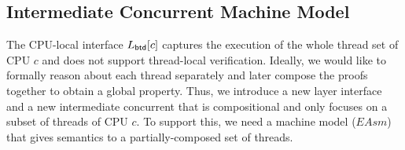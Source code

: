 \subsection{Intermediate Concurrent Machine Model}\label{subsec:fulleasm}

The CPU-local interface  $L_{\mathsf{\textcolor{black}{btd}}}[c]$
captures the execution of the whole
thread set of CPU $c$ and does not support thread-local verification.
Ideally, we would like to formally reason about each thread separately
 and later compose the proofs together to obtain a global
property.
Thus, we introduce a new layer interface and a new intermediate concurrent 
 that is compositional 
and only focuses on a subset of threads of CPU $c$.
To support this, we need a machine model ($EAsm$) that gives semantics to
a partially-composed set of threads.

